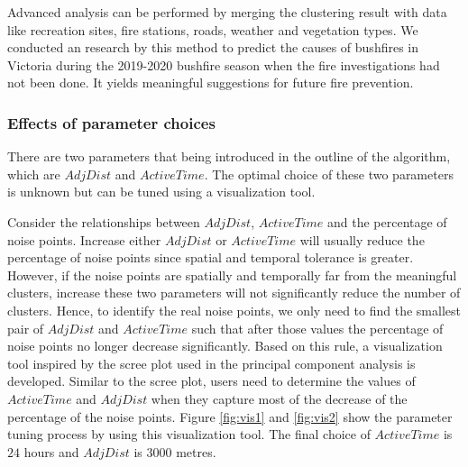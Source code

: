 Advanced analysis can be performed by merging the clustering result with
data like recreation sites, fire stations, roads, weather and vegetation
types. We conducted an research \citep{conart} by this method to predict
the causes of bushfires in Victoria during the 2019-2020 bushfire season
when the fire investigations had not been done. It yields meaningful
suggestions for future fire prevention.

\hypertarget{effects-of-parameter-choices}{%
\subsubsection{Effects of parameter
choices}\label{effects-of-parameter-choices}}

There are two parameters that being introduced in the outline of the
algorithm, which are \(AdjDist\) and \(ActiveTime\). The optimal choice
of these two parameters is unknown but can be tuned using a
visualization tool.

Consider the relationships between \(AdjDist\), \(ActiveTime\) and the
percentage of noise points. Increase either \(AdjDist\) or
\(ActiveTime\) will usually reduce the percentage of noise points since
spatial and temporal tolerance is greater. However, if the noise points
are spatially and temporally far from the meaningful clusters, increase
these two parameters will not significantly reduce the number of
clusters. Hence, to identify the real noise points, we only need to find
the smallest pair of \(AdjDist\) and \(ActiveTime\) such that after
those values the percentage of noise points no longer decrease
significantly. Based on this rule, a visualization tool inspired by the
scree plot used in the principal component analysis is developed.
Similar to the scree plot, users need to determine the values of
\(ActiveTime\) and \(AdjDist\) when they capture most of the decrease of
the percentage of the noise points. Figure \ref{fig:vis1} and
\ref{fig:vis2} show the parameter tuning process by using this
visualization tool. The final choice of \(ActiveTime\) is \(24\) hours
and \(AdjDist\) is \(3000\) metres.

